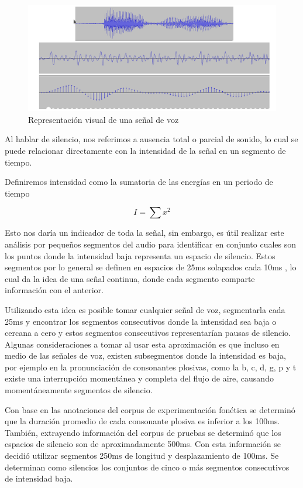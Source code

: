 \begin{figure}[H]
\caption{Representación visual de una señal de voz}
\label{img:pcm}
\includegraphics[width=\textwidth]{imagenes/04_01_pcm.png}
\end{figure}

Al hablar de silencio, nos referimos a ausencia total o parcial de sonido, lo cual se puede relacionar directamente con la intensidad de la señal en un segmento de tiempo.

Definiremos intensidad como la sumatoria de las energías en un periodo de tiempo  \cite{Jurafsky2000SpeechRecognition}    

\begin{equation}
\label{eq:energy}
I = \sum{x^2}  
\end{equation}

Esto nos daría un indicador de toda la señal, sin embargo, es útil realizar este análisis por pequeños segmentos del audio para identificar en conjunto cuales son los puntos donde la intensidad baja representa un espacio de silencio. Estos segmentos por lo general se definen en espacios de 25ms solapados cada 10ms \cite{Jurafsky2000SpeechRecognition}, lo cual da la idea de una señal continua, donde cada segmento comparte información con el anterior. 

Utilizando esta idea es posible tomar cualquier señal de voz, segmentarla cada 25ms y encontrar los segmentos consecutivos donde la intensidad sea baja o cercana a cero y estos segmentos consecutivos representarían pausas de silencio. Algunas consideraciones a tomar al usar esta aproximación es que incluso en medio de las señales de voz, existen subsegmentos donde la intensidad es baja, por ejemplo en la pronunciación de consonantes plosivas, como la b, c, d, g, p y t existe una interrupción momentánea y completa del flujo de aire, causando momentáneamente segmentos de silencio.

Con base en las anotaciones del corpus de experimentación fonética se determinó que la duración promedio de cada consonante plosiva es inferior a los 100ms. También, extrayendo información del corpus de pruebas se determinó que los espacios de silencio son de aproximadamente 500ms. Con esta información se decidió utilizar segmentos 250ms de longitud y desplazamiento de 100ms. Se determinan como silencios los conjuntos de cinco o más segmentos consecutivos de intensidad baja.

